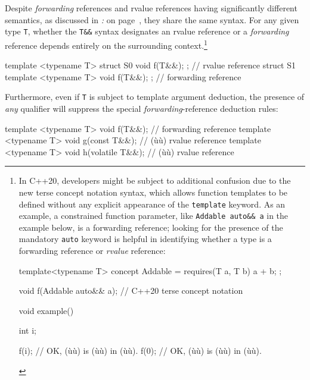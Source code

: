 Despite \emph{forwarding} references and rvalue
references having significantly different semantics, as discussed in \textit{: } on page~\pageref{identifying-forwarding-references}, they share the same syntax. For any given type \texttt{T},
whether the \texttt{T\&\&} syntax designates an rvalue
reference or a \emph{forwarding} reference depends entirely on the
surrounding context.{\cprotect\footnote{In C++20, developers might be
subject to additional confusion due to the new terse concept notation
syntax, which allows function templates to be defined without any
explicit appearance of the \texttt{template} keyword. As an example, a
constrained function parameter, like
\texttt{Addable}~\texttt{auto\&\&}~\texttt{a} in the example below, is a forwarding
reference; looking for the presence of the mandatory \texttt{auto}
keyword is helpful in identifying whether a type is a forwarding
reference or \emph{rvalue} reference:

\begin{emcppslisting}[basicstyle={\ttfamily\footnotesize}]
template<typename T>
concept Addable = requires(T a, T b) { a + b; };

void f(Addable auto&& a);  // C++20 terse concept notation

void example()
{
    int i;

    f(i);  // OK, (ù{}ù) is (ù{}ù) in (ù{}ù).
    f(0);  // OK, (ù{}ù) is (ù{}ù) in (ù{}ù).
}
\end{emcppslisting}
      }}

\begin{emcppslisting}
template <typename T> struct S0 { void f(T&&); };  // rvalue reference
struct S1 { template <typename T> void f(T&&); };  // forwarding reference
\end{emcppslisting}

\noindent Furthermore, even if \texttt{T} is subject to template argument
deduction, the presence of \emph{any} qualifier will suppress the
special \emph{forwarding}-reference deduction rules:

\begin{emcppslisting}
template <typename T> void f(T&&);           // forwarding reference
template <typename T> void g(const T&&);     // (ù{}ù) rvalue reference
template <typename T> void h(volatile T&&);  // (ù{}ù) rvalue reference
\end{emcppslisting}

